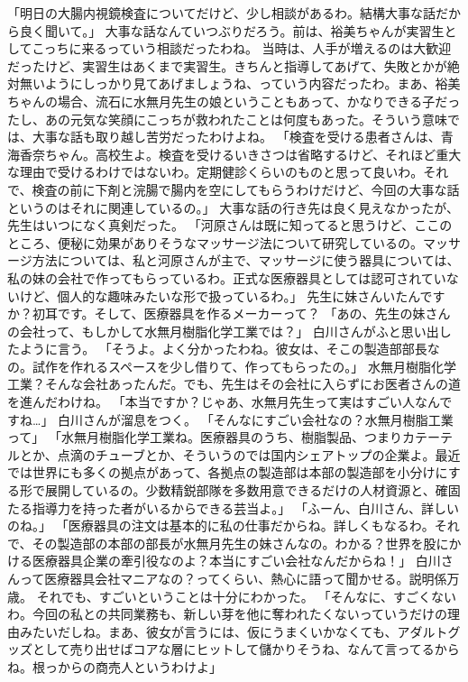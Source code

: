 「明日の大腸内視鏡検査についてだけど、少し相談があるわ。結構大事な話だから良く聞いて。」
大事な話なんていつぶりだろう。前は、裕美ちゃんが実習生としてこっちに来るっていう相談だったわね。
当時は、人手が増えるのは大歓迎だったけど、実習生はあくまで実習生。きちんと指導してあげて、失敗とかが絶対無いようにしっかり見てあげましょうね、っていう内容だったわ。まあ、裕美ちゃんの場合、流石に水無月先生の娘ということもあって、かなりできる子だったし、あの元気な笑顔にこっちが救われたことは何度もあった。そういう意味では、大事な話も取り越し苦労だったわけよね。
「検査を受ける患者さんは、青海香奈ちゃん。高校生よ。検査を受けるいきさつは省略するけど、それほど重大な理由で受けるわけではないわ。定期健診くらいのものと思って良いわ。それで、検査の前に下剤と浣腸で腸内を空にしてもらうわけだけど、今回の大事な話というのはそれに関連しているの。」
大事な話の行き先は良く見えなかったが、先生はいつになく真剣だった。
「河原さんは既に知ってると思うけど、ここのところ、便秘に効果がありそうなマッサージ法について研究しているの。マッサージ方法については、私と河原さんが主で、マッサージに使う器具については、私の妹の会社で作ってもらっているわ。正式な医療器具としては認可されていないけど、個人的な趣味みたいな形で扱っているわ。」
先生に妹さんいたんですか？初耳です。そして、医療器具を作るメーカーって？
「あの、先生の妹さんの会社って、もしかして水無月樹脂化学工業では？」
白川さんがふと思い出したように言う。
「そうよ。よく分かったわね。彼女は、そこの製造部部長なの。試作を作れるスペースを少し借りて、作ってもらったの。」
水無月樹脂化学工業？そんな会社あったんだ。でも、先生はその会社に入らずにお医者さんの道を進んだわけね。
「本当ですか？じゃあ、水無月先生って実はすごい人なんですね…」
白川さんが溜息をつく。
「そんなにすごい会社なの？水無月樹脂工業って」
「水無月樹脂化学工業ね。医療器具のうち、樹脂製品、つまりカテーテルとか、点滴のチューブとか、そういうのでは国内シェアトップの企業よ。最近では世界にも多くの拠点があって、各拠点の製造部は本部の製造部を小分けにする形で展開しているの。少数精鋭部隊を多数用意できるだけの人材資源と、確固たる指導力を持った者がいるからできる芸当よ。」
「ふーん、白川さん、詳しいのね。」
「医療器具の注文は基本的に私の仕事だからね。詳しくもなるわ。それで、その製造部の本部の部長が水無月先生の妹さんなの。わかる？世界を股にかける医療器具企業の牽引役なのよ？本当にすごい会社なんだからね！」
白川さんって医療器具会社マニアなの？ってくらい、熱心に語って聞かせる。説明係万歳。
それでも、すごいということは十分にわかった。
「そんなに、すごくないわ。今回の私との共同業務も、新しい芽を他に奪われたくないっていうだけの理由みたいだしね。まあ、彼女が言うには、仮にうまくいかなくても、アダルトグッズとして売り出せばコアな層にヒットして儲かりそうね、なんて言ってるからね。根っからの商売人というわけよ」
